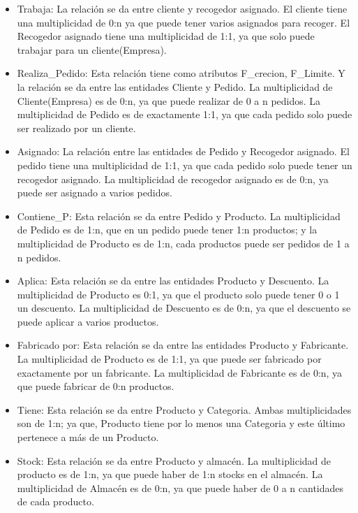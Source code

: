 \documentclass[10pt, a4paper,openany]{report}
\begin{document}
\begin{itemize}
  \item Trabaja: La relación se da entre cliente y recogedor asignado. El cliente tiene una multiplicidad de 0:n ya que puede tener varios asignados para recoger. El Recogedor asignado tiene una multiplicidad de 1:1, ya que solo puede trabajar para un cliente(Empresa).

\item Realiza\_Pedido: Esta relación tiene como atributos F\_crecion, F\_Limite. Y la relación se da entre las entidades Cliente y Pedido. La multiplicidad de Cliente(Empresa) es de 0:n, ya que puede realizar  de 0 a n pedidos. La multiplicidad de Pedido es de exactamente 1:1, ya que cada pedido solo puede ser realizado por un cliente.

\item Asignado: La relación entre las entidades de Pedido y Recogedor asignado. El pedido tiene una multiplicidad de 1:1, ya que cada pedido solo puede tener un recogedor asignado. La multiplicidad de recogedor asignado es de 0:n, ya puede ser asignado a varios pedidos.
 
\item Contiene\_P: Esta relación se da entre Pedido y Producto. La multiplicidad de Pedido es de 1:n, que en un pedido puede tener 1:n productos; y la multiplicidad de Producto es de 1:n, cada productos puede ser pedidos de 1 a n pedidos.
\item Aplica: Esta relación se da entre las entidades Producto y Descuento. La multiplicidad de  Producto es 0:1, ya que el producto solo puede tener 0 o 1 un descuento. La multiplicidad de Descuento es de 0:n, ya que el descuento se puede aplicar a varios productos.
\item Fabricado por: Esta relación se da entre las entidades Producto y Fabricante. La multiplicidad de Producto es de 1:1, ya que puede ser fabricado por exactamente por un fabricante. La multiplicidad de Fabricante es de 0:n, ya que puede fabricar de 0:n productos. 
\item Tiene: Esta relación se da entre Producto y Categoria. Ambas multiplicidades son de 1:n; ya que, Producto tiene por lo menos una Categoria y este último pertenece a más de un Producto.
\item Stock: Esta relación se da entre Producto y almacén. La multiplicidad de  producto es de 1:n, ya que puede haber de 1:n stocks en el almacén. La multiplicidad de Almacén es de  0:n, ya que puede haber de 0 a n cantidades de cada producto.


\end{itemize}
\end{document}
